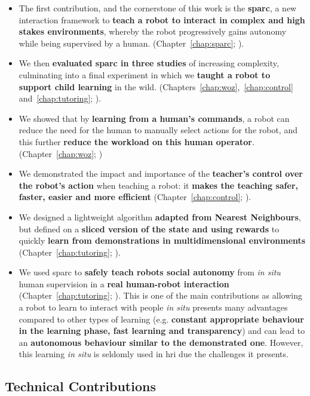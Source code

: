\begin{itemize}
	\item The first contribution, and the cornerstone of this work is the \textbf{\acrfull{sparc}}, a new interaction framework to \textbf{teach a robot to interact in complex and high stakes environments}, whereby the robot progressively gains autonomy while being supervised by a human. (Chapter~\ref{chap:sparc}; \citealt{senft2015human,senft2015sparc}).
	\item We then \textbf{evaluated \gls{sparc} in three studies} of increasing complexity, culminating into a final experiment in which we \textbf{taught a robot to support child learning} in the wild. (Chapters~\ref{chap:woz},~\ref{chap:control} and~\ref{chap:tutoring}; \citealt{senft2015sparc,senft2017supervised,senft2018robots}).
	\item We showed that by \textbf{learning from a human's commands}, a robot can reduce the need for the human to manually select actions for the robot, and this further \textbf{reduce the workload on this human operator}. (Chapter~\ref{chap:woz}; \citealt{senft2015sparc})	
	\item We demonstrated the impact and importance of the \textbf{teacher's control over the robot's action} when teaching a robot: it \textbf{makes the teaching safer, faster, easier and more efficient} (Chapter~\ref{chap:control}; \citealt{senft2016sparc,senft2017supervised}).
	\item We designed a lightweight algorithm \textbf{adapted from Nearest Neighbours}, but defined on a \textbf{sliced version of the state and using rewards} to quickly \textbf{learn from demonstrations in multidimensional environments} (Chapter~\ref{chap:tutoring}; \citealt{senft2017toward}).
	\item We used \gls{sparc} to \textbf{safely teach robots social autonomy}  from \textit{in situ} human supervision in a \textbf{real human-robot interaction} (Chapter~\ref{chap:tutoring}; \citealt{senft2018robots}). This is one of the main contributions as allowing a robot to learn to interact with people \textit{in situ} presents many advantages compared to other types of learning (e.g. \textbf{constant appropriate behaviour in the learning phase, fast learning and transparency}) and can lead to an \textbf{autonomous behaviour similar to the demonstrated one}. However, this learning \emph{in situ} is seldomly used in \gls{hri} due the challenges it presents.
\end{itemize}

\subsection{Technical Contributions}

